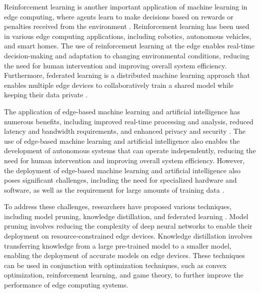 \documentclass[11pt]{article}
\begin{document}
Reinforcement learning is another important application of machine learning in edge computing, where agents learn to make decisions based on rewards or penalties received from the environment \cite{ref76}. Reinforcement learning has been used in various edge computing applications, including robotics, autonomous vehicles, and smart homes. The use of reinforcement learning at the edge enables real-time decision-making and adaptation to changing environmental conditions, reducing the need for human intervention and improving overall system efficiency. Furthermore, federated learning is a distributed machine learning approach that enables multiple edge devices to collaboratively train a shared model while keeping their data private \cite{ref77}.

The application of edge-based machine learning and artificial intelligence has numerous benefits, including improved real-time processing and analysis, reduced latency and bandwidth requirements, and enhanced privacy and security \cite{ref78}. The use of edge-based machine learning and artificial intelligence also enables the development of autonomous systems that can operate independently, reducing the need for human intervention and improving overall system efficiency. However, the deployment of edge-based machine learning and artificial intelligence also poses significant challenges, including the need for specialized hardware and software, as well as the requirement for large amounts of training data \cite{ref7}.

To address these challenges, researchers have proposed various techniques, including model pruning, knowledge distillation, and federated learning \cite{ref77}. Model pruning involves reducing the complexity of deep neural networks to enable their deployment on resource-constrained edge devices. Knowledge distillation involves transferring knowledge from a large pre-trained model to a smaller model, enabling the deployment of accurate models on edge devices. These techniques can be used in conjunction with optimization techniques, such as convex optimization, reinforcement learning, and game theory, to further improve the performance of edge computing systems.
\end{document}
